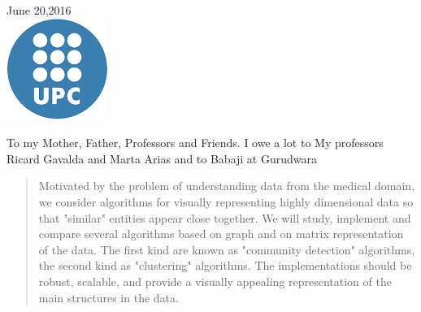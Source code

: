 \begin{titlepage}

\bigskip
\bigskip
{\large June 20,2016}\\[2cm] %


\includegraphics{logo.png}\\[1cm] %
 

\vfill %

\end{titlepage}

\newpage




\begin{dedication}
To my Mother, Father, Professors and Friends. I owe a lot to My professors Ricard Gavalda and Marta Arias and to Babaji at Gurudwara
\end{dedication}
\newpage
\clearpage
\newpage
\newpage

\begin{abstract}
Motivated by the problem of understanding data from
the medical domain, we consider algorithms for visually representing 
highly dimensional data so that "similar" entities appear close together. We will study, 
implement and compare several algorithms based on graph and on matrix
representation of the data. The first kind are known as "community detection"
algorithms, the second kind as "clustering" algorithms. The implementations
should be robust, scalable, and provide a visually appealing representation
of the main structures in the data.

\end{abstract}

